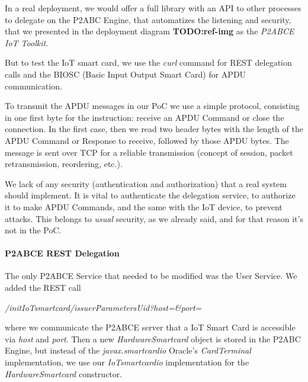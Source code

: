 

In a real deployment, we would offer a full library with an API to other processes to delegate on the P2ABC Engine, that automatizes the listening and security, that we presented in the deployment diagram \textbf{TODO:ref-img} as the \textit{P2ABCE IoT Toolkit}.

But to test the IoT smart card, we use the \textit{curl} command for REST delegation calls and the BIOSC (Basic Input Output Smart Card) for APDU communication.

To transmit the APDU messages in our PoC we use a simple protocol, consisting in one first byte for the instruction: receive an APDU Command or close the connection. In the first case, then we read two header bytes with the length of the APDU Command or Response to receive, followed by those APDU bytes. The message is sent over TCP for a reliable transmission (concept of session, packet retransmission, reordering, etc.).

We lack of any security (authentication and authorization) that a real system should implement. It is vital to authenticate the delegation service, to authorize it to make APDU Commands, and the same with the IoT device, to prevent attacks. This belongs to \textit{usual} security, as we already said, and for that reason it's not in the PoC.

\paragraph{P2ABCE REST Delegation}


The only P2ABCE Service that needed to be modified was the User Service. We added the REST call

\begin{center}
	\textit{/initIoTsmartcard/{issuerParametersUid}?host=\&port=}
\end{center}

where we communicate the P2ABCE server that a IoT Smart Card is accessible via \textit{host} and \textit{port}. Then a new \textit{HardwareSmartcard} object is stored in the P2ABC Engine, but instead of the \textit{javax.smartcardio} Oracle's \textit{CardTerminal} implementation, we use our \textit{IoTsmartcardio} implementation for the \textit{HardwareSmartcard} constructor.

